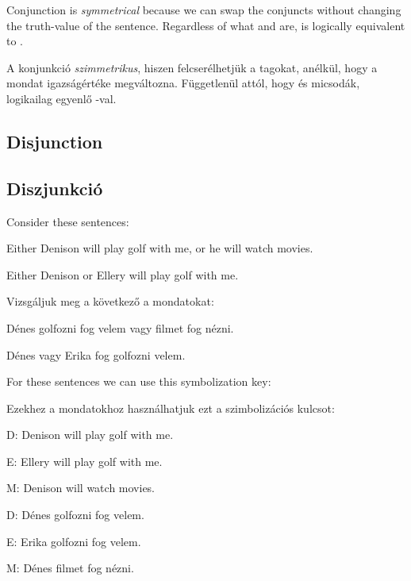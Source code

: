 Conjunction is \emph{symmetrical} because we can swap the conjuncts without changing the truth-value of the sentence. Regardless of what  and  are, \eand{} is logically equivalent to \eand{}.

A konjunkció \emph{szimmetrikus}, hiszen felcserélhetjük a tagokat, anélkül, hogy a mondat igazságértéke megváltozna. Függetlenül attól, hogy
 és  micsodák, \eand{} logikailag egyenlő \eand{}-val.

\subsection*{Disjunction}
\subsection{Diszjunkció}
Consider these sentences:
\begin{earg}
\item[\ex{or1}]Either Denison will play golf with me, or he will watch movies.
\item[\ex{or2}]Either Denison or Ellery will play golf with me. 
\end{earg}

Vizsgáljuk meg a következő a mondatokat:
\begin{earg}
\item[\ex{or1}]Dénes golfozni fog velem vagy filmet fog nézni.
\item[\ex{or2}]Dénes vagy Erika fog golfozni velem.
\end{earg}

For these sentences we can use this symbolization key:

Ezekhez a mondatokhoz használhatjuk ezt a szimbolizációs kulcsot:

\begin{ekey}
\item[D:] Denison will play golf with me.
\item[E:] Ellery will play golf with me.
\item[M:] Denison will watch movies.
\end{ekey}

\begin{ekey}
\item[D:] Dénes golfozni fog velem.
\item[E:] Erika golfozni fog velem.
\item[M:] Dénes filmet fog nézni.
\end{ekey}

